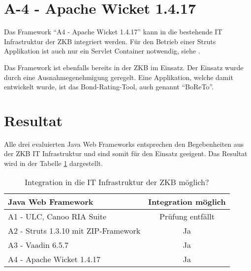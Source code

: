\section{A-4 - Apache Wicket 1.4.17}

Das Framework ``A4 - Apache Wicket 1.4.17'' kann in die bestehende IT
Infrastruktur der \ac{ZKB} integriert werden. Für den Betrieb einer Struts
Applikation ist auch nur ein Servlet Container notwendig, siehe
\cite{WicketDokumentation}.

Das Framework ist ebenfalls bereits in der \ac{ZKB} im Einsatz. Der Einsatz
wurde durch eine Ausnahmegenehmigung geregelt. Eine Applikation, welche damit
entwickelt wurde, ist das Bond-Rating-Tool, auch genannt ``BoReTo''.

\section{Resultat}

Alle drei evaluierten Java Web Frameworks entsprechen den Begebenheiten aus der
\ac{ZKB} IT Infrastruktur und sind somit für den Einsatz geeigent. Das Resultat
wird in der Tabelle \ref{tab:integrationMoeglich} dargestellt.
\newline

\begin{table}[!h]
  \sffamily 
  \begin{center}
    \begin{tabular}{lc}
      \toprule
      \textbf{Java Web Framework} & \textbf{Integration möglich}\\
      \midrule
      A1 - ULC, Canoo RIA Suite & Prüfung entfällt\\
      A2 - Struts 1.3.10 mit ZIP-Framework & Ja\\
      A3 - Vaadin 6.5.7 & Ja\\
      A4 - Apache Wicket 1.4.17 & Ja\\
      \bottomrule
    \end{tabular}
    \caption{Integration in die IT Infrastruktur der \ac{ZKB} möglich?}
    \label{tab:integrationMoeglich}
  \end{center}
\end{table}